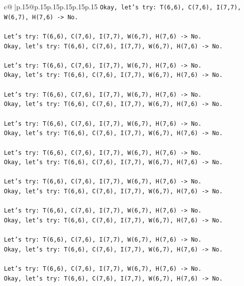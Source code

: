 \documentclass{article}
\begin{document}
{\begin{supertabular}{c@{$\;$}|p{.15\linewidth}@{}p{.15\linewidth}p{.15\linewidth}p{.15\linewidth}p{.15\linewidth}p{.15\linewidth}}
{{{\texttt{Okay, let's try: T(6,6), C(7,6), I(7,7), W(6,7), H(7,6) {-}> No.} \\
\\ 
\texttt{Let's try: T(6,6), C(7,6), I(7,7), W(6,7), H(7,6) {-}> No.} \\
\texttt{Okay, let's try: T(6,6), C(7,6), I(7,7), W(6,7), H(7,6) {-}> No.} \\
\\ 
\texttt{Let's try: T(6,6), C(7,6), I(7,7), W(6,7), H(7,6) {-}> No.} \\
\texttt{Okay, let's try: T(6,6), C(7,6), I(7,7), W(6,7), H(7,6) {-}> No.} \\
\\ 
\texttt{Let's try: T(6,6), C(7,6), I(7,7), W(6,7), H(7,6) {-}> No.} \\
\texttt{Okay, let's try: T(6,6), C(7,6), I(7,7), W(6,7), H(7,6) {-}> No.} \\
\\ 
\texttt{Let's try: T(6,6), C(7,6), I(7,7), W(6,7), H(7,6) {-}> No.} \\
\texttt{Okay, let's try: T(6,6), C(7,6), I(7,7), W(6,7), H(7,6) {-}> No.} \\
\\ 
\texttt{Let's try: T(6,6), C(7,6), I(7,7), W(6,7), H(7,6) {-}> No.} \\
\texttt{Okay, let's try: T(6,6), C(7,6), I(7,7), W(6,7), H(7,6) {-}> No.} \\
\\ 
\texttt{Let's try: T(6,6), C(7,6), I(7,7), W(6,7), H(7,6) {-}> No.} \\
\texttt{Okay, let's try: T(6,6), C(7,6), I(7,7), W(6,7), H(7,6) {-}> No.} \\
\\ 
\texttt{Let's try: T(6,6), C(7,6), I(7,7), W(6,7), H(7,6) {-}> No.} \\
\texttt{Okay, let's try: T(6,6), C(7,6), I(7,7), W(6,7), H(7,6) {-}> No.} \\
\\ 
\texttt{Let's try: T(6,6), C(7,6), I(7,7), W(6,7), H(7,6) {-}> No.} \\
\texttt{Okay, let's try: T(6,6), C(7,6), I(7,7), W(6,7), H(7,6) {-}> No.} \\
\\ 
\texttt{Let's try: T(6,6), C(7,6), I(7,7), W(6,7), H(7,6) {-}> No.} \\
\texttt{Okay, let's try: T(6,6), C(7,6), I(7,7), W(6,7), H(7,6) {-}> No.} \\
\\ 
}}}
\end{supertabular}}
\end{document}
